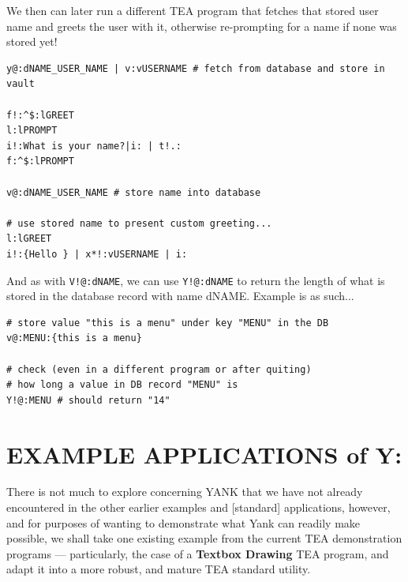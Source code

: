 \documentclass[a4paper, 18pt]{book} %
\begin{document}
{{{We then can later run a different TEA program that fetches that stored user name and greets the user with it, otherwise re-prompting for a name if none was stored yet!

\vspace{2em}
  \begin{tcolorbox}[teaterminalstyle, title=Y: EXAMPLE 3: Retrieving a User's Name from the TEA DATABASE, breakable]
  \begin{lstlisting}[language=TEA,breaklines=true,]
y@:dNAME_USER_NAME | v:vUSERNAME # fetch from database and store in vault

f!:^$:lGREET
l:lPROMPT
i!:What is your name?|i: | t!.:
f:^$:lPROMPT

v@:dNAME_USER_NAME # store name into database

# use stored name to present custom greeting...
l:lGREET
i!:{Hello } | x*!:vUSERNAME | i:
   \end{lstlisting}
  \end{tcolorbox}
\vspace{2em}


And as with \texttt{V!@:dNAME}, we can use \texttt{Y!@:dNAME} to return the length of what is stored in the database record with name dNAME. Example is as such...


\vspace{2em}
  \begin{tcolorbox}[teaterminalstyle, title=Y: EXAMPLE 4: Retrieving a Record's Length from the TEA DATABASE, breakable]
  \begin{lstlisting}[language=TEA,breaklines=true,]
# store value "this is a menu" under key "MENU" in the DB
v@:MENU:{this is a menu}

# check (even in a different program or after quiting)
# how long a value in DB record "MENU" is
Y!@:MENU # should return "14"
   \end{lstlisting}
  \end{tcolorbox}
\vspace{2em}



\section{EXAMPLE APPLICATIONS of Y:}
\label{SECEXAMPI}

  
There is not much to explore concerning YANK that we have not already encountered in the other earlier examples and [standard] applications, however, and for purposes of wanting to demonstrate what Yank can readily make possible, we shall take one existing example from the current TEA demonstration programs --- particularly, the case of a \textbf{Textbox Drawing} TEA program, and adapt it into a more robust, and mature TEA standard utility.

}}}
\end{document}
